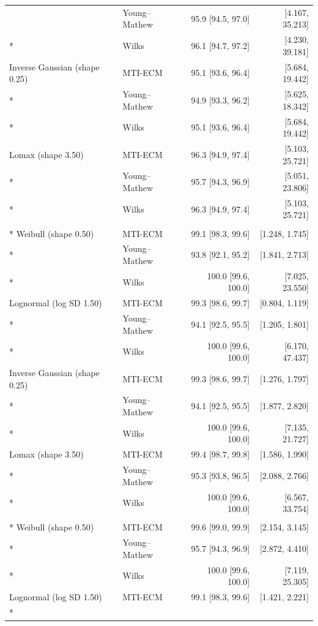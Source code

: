 \begin{longtable}{@{}llrr@{}}
 & Young--Mathew & 95.9 [94.5, 97.0] & [4.167, 35.213] \\*
 & Wilks & 96.1 [94.7, 97.2] & [4.230, 39.181] \\
Inverse Gaussian (shape 0.25) & MTI-ECM & 95.1 [93.6, 96.4] & [5.684, 19.442] \\*
 & Young--Mathew & 94.9 [93.3, 96.2] & [5.625, 18.342] \\*
 & Wilks & 95.1 [93.6, 96.4] & [5.684, 19.442] \\
Lomax (shape 3.50) & MTI-ECM & 96.3 [94.9, 97.4] & [5.103, 25.721] \\*
 & Young--Mathew & 95.7 [94.3, 96.9] & [5.051, 23.806] \\*
 & Wilks & 96.3 [94.9, 97.4] & [5.103, 25.721] \\
\newpage
\multicolumn{4}{l}{\textbf{\(n=1000, c=0.90, p=0.95\)}} \\*
Weibull (shape 0.50) & MTI-ECM & 99.1 [98.3, 99.6] & [1.248, 1.745] \\*
 & Young--Mathew & 93.8 [92.1, 95.2] & [1.841, 2.713] \\*
 & Wilks & 100.0 [99.6, 100.0] & [7.025, 23.550] \\
Lognormal (log SD 1.50) & MTI-ECM & 99.3 [98.6, 99.7] & [0.804, 1.119] \\*
 & Young--Mathew & 94.1 [92.5, 95.5] & [1.205, 1.801] \\*
 & Wilks & 100.0 [99.6, 100.0] & [6.170, 47.437] \\
Inverse Gaussian (shape 0.25) & MTI-ECM & 99.3 [98.6, 99.7] & [1.276, 1.797] \\*
 & Young--Mathew & 94.1 [92.5, 95.5] & [1.877, 2.820] \\*
 & Wilks & 100.0 [99.6, 100.0] & [7.135, 21.727] \\
Lomax (shape 3.50) & MTI-ECM & 99.4 [98.7, 99.8] & [1.586, 1.990] \\*
 & Young--Mathew & 95.3 [93.8, 96.5] & [2.088, 2.766] \\*
 & Wilks & 100.0 [99.6, 100.0] & [6.567, 33.754] \\
\addlinespace[0.4em]
\multicolumn{4}{l}{\textbf{\(n=1000, c=0.95, p=0.95\)}} \\*
Weibull (shape 0.50) & MTI-ECM & 99.6 [99.0, 99.9] & [2.154, 3.145] \\*
 & Young--Mathew & 95.7 [94.3, 96.9] & [2.872, 4.410] \\*
 & Wilks & 100.0 [99.6, 100.0] & [7.119, 25.305] \\
Lognormal (log SD 1.50) & MTI-ECM & 99.1 [98.3, 99.6] & [1.421, 2.221] \\*

\end{longtable}
